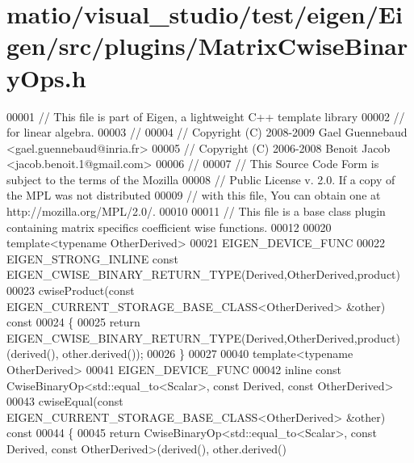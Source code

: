 \hypertarget{matio_2visual__studio_2test_2eigen_2_eigen_2src_2plugins_2_matrix_cwise_binary_ops_8h_source}{}\section{matio/visual\+\_\+studio/test/eigen/\+Eigen/src/plugins/\+Matrix\+Cwise\+Binary\+Ops.h}
\label{matio_2visual__studio_2test_2eigen_2_eigen_2src_2plugins_2_matrix_cwise_binary_ops_8h_source}

\begin{DoxyCode}
00001 \textcolor{comment}{// This file is part of Eigen, a lightweight C++ template library}
00002 \textcolor{comment}{// for linear algebra.}
00003 \textcolor{comment}{//}
00004 \textcolor{comment}{// Copyright (C) 2008-2009 Gael Guennebaud <gael.guennebaud@inria.fr>}
00005 \textcolor{comment}{// Copyright (C) 2006-2008 Benoit Jacob <jacob.benoit.1@gmail.com>}
00006 \textcolor{comment}{//}
00007 \textcolor{comment}{// This Source Code Form is subject to the terms of the Mozilla}
00008 \textcolor{comment}{// Public License v. 2.0. If a copy of the MPL was not distributed}
00009 \textcolor{comment}{// with this file, You can obtain one at http://mozilla.org/MPL/2.0/.}
00010 
00011 \textcolor{comment}{// This file is a base class plugin containing matrix specifics coefficient wise functions.}
00012 
00020 \textcolor{keyword}{template}<\textcolor{keyword}{typename} OtherDerived>
00021 EIGEN\_DEVICE\_FUNC
00022 EIGEN\_STRONG\_INLINE \textcolor{keyword}{const} EIGEN\_CWISE\_BINARY\_RETURN\_TYPE(Derived,OtherDerived,product)
00023 cwiseProduct(\textcolor{keyword}{const} EIGEN\_CURRENT\_STORAGE\_BASE\_CLASS<OtherDerived> &other)\textcolor{keyword}{ const}
00024 \textcolor{keyword}{}\{
00025   \textcolor{keywordflow}{return} EIGEN\_CWISE\_BINARY\_RETURN\_TYPE(Derived,OtherDerived,product)(derived(), other.derived());
00026 \}
00027 
00040 \textcolor{keyword}{template}<\textcolor{keyword}{typename} OtherDerived>
00041 EIGEN\_DEVICE\_FUNC
00042 \textcolor{keyword}{inline} \textcolor{keyword}{const} CwiseBinaryOp<std::equal\_to<Scalar>, \textcolor{keyword}{const} Derived, \textcolor{keyword}{const} OtherDerived>
00043 cwiseEqual(\textcolor{keyword}{const} EIGEN\_CURRENT\_STORAGE\_BASE\_CLASS<OtherDerived> &other)\textcolor{keyword}{ const}
00044 \textcolor{keyword}{}\{
00045   \textcolor{keywordflow}{return} CwiseBinaryOp<std::equal\_to<Scalar>, \textcolor{keyword}{const} Derived, \textcolor{keyword}{const} OtherDerived>(derived(), other.derived()

\end{DoxyCode}
